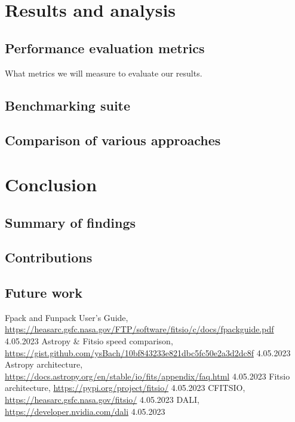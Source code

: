 \documentclass[licencjacka,en]{pracamgr}
\begin{document}
\chapter{Results and analysis}
\section{Performance evaluation metrics}
What metrics we will measure to evaluate our results.
\section{Benchmarking suite}
\section{Comparison of various approaches}

\chapter{Conclusion}
\section{Summary of findings}
\section{Contributions}
\section{Future work}



\begin{thebibliography}{99}
	 {Fpack and Funpack User's Guide},
	\url{https://heasarc.gsfc.nasa.gov/FTP/software/fitsio/c/docs/fpackguide.pdf} 4.05.2023
	 {Astropy \& Fitsio speed comparison},
	\url{https://gist.github.com/ysBach/10bf843233e821dbc5fc50e2a3d2dc8f} 4.05.2023
	 {Astropy architecture},
	\url{https://docs.astropy.org/en/stable/io/fits/appendix/faq.html} 4.05.2023
	 {Fitsio architecture},
	\url{https://pypi.org/project/fitsio/} 4.05.2023
	 CFITSIO,
	\url{https://heasarc.gsfc.nasa.gov/fitsio/} 4.05.2023
	 DALI,
	\url{https://developer.nvidia.com/dali} 4.05.2023
\end{thebibliography}
\end{document}
